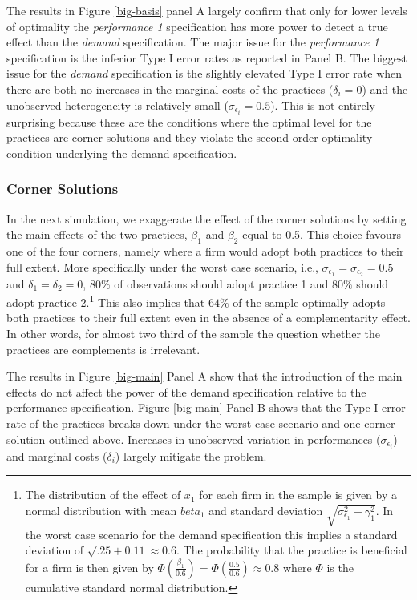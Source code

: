 \documentclass[12pt]{article}
\begin{document}


The results in Figure \ref{big-basis} panel A largely confirm that only for lower levels of optimality the \emph{performance 1} specification has more power to detect a true effect than the \emph{demand} specification. The major issue for the \emph{performance 1} specification is the inferior Type I error rates as reported in Panel B. The biggest issue for the \emph{demand} specification is the slightly elevated Type I error rate when there are both no increases in the marginal costs of the practices ($\delta_i = 0$) and the unobserved heterogeneity is relatively small ($\sigma_{\epsilon_i} = 0.5$). This is not entirely surprising because these are the conditions where the optimal level for the practices are corner solutions and they violate the second-order optimality condition underlying the demand specification.

\subsubsection{Corner Solutions}

In the next simulation, we exaggerate the effect of the corner solutions by setting the main effects of the two practices, $\beta_{1}$ and $\beta_2$ equal to 0.5. This choice favours one of the four corners, namely where a firm would adopt both practices to their full extent. More specifically under the worst case scenario, i.e., $\sigma_{\epsilon_1} = \sigma_{\epsilon_2} = 0.5$ and $\delta_1 = \delta_2 = 0$, $80\%$ of observations should adopt practice 1 and $80\%$ should adopt practice 2.\footnote{The distribution of the effect of $x_1$ for each firm in the sample is given by a normal distribution with mean $beta_1$ and standard deviation $\sqrt{\sigma_{\epsilon_1}^2 + \gamma_1^2}$. In the worst case scenario for the demand specification this implies a standard deviation of $\sqrt{.25 + 0.11} \approx  0.6$. The probability that the practice is beneficial for a firm is then given by $\Phi(\frac{\beta_1}{0.6}) = \Phi(\frac{0.5}{0.6}) \approx 0.8$ where $\Phi$ is the cumulative standard normal distribution.}
This also implies that $64\%$ of the sample optimally adopts both practices to their full extent even in the absence of a complementarity effect. In other words, for almost two third of the sample the question whether the practices are complements is irrelevant.   

The results in Figure \ref{big-main} Panel A show that the introduction of the main effects do not affect the power of the demand specification relative to the performance specification. Figure \ref{big-main} Panel B shows that the Type I error rate of the practices breaks down under the worst case scenario and one corner solution outlined above. Increases in unobserved variation in performances ($\sigma_{\epsilon_i}$) and marginal costs ($\delta_i$) largely mitigate the problem. 
\end{document}
